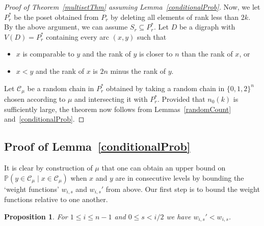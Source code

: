 \documentclass[11 pt]{article}
\newtheorem{prop}[equation]{Proposition}
\theoremstyle{definition}
\theoremstyle{case}
\numberwithin{equation}{section}
\begin{document}
\begin{proof}[Proof of Theorem~\ref{multisetThm} assuming Lemma~\ref{conditionalProb}]
Now, we let $P_r^*$ be the poset obtained from $P_r$ by deleting all elements of rank less than $2k$. By the above argument, we can assume $S_r\subseteq P_r^*$. Let $D$ be a digraph with $V(D)=P_r^*$ containing every arc $(x,y)$ such that
\begin{itemize}
\item $x$ is comparable to $y$ and the rank of $y$ is closer to $n$ than the rank of $x$, or
\item $x<y$ and the rank of $x$ is $2n$ minus the rank of $y$. 
\end{itemize}
Let $\mathcal{C}_\mu$ be a random chain in $P_r^*$ obtained by taking a random chain in $\{0,1,2\}^n$ chosen according to $\mu$ and intersecting it with $P_r^*$. Provided that $n_0(k)$ is sufficiently large, the theorem now follows from Lemmas~\ref{randomCount} and~\ref{conditionalProb}.
\end{proof}

\subsection{Proof of Lemma~\ref{conditionalProb}}

It is clear by construction of $\mu$ that one can obtain an upper bound on  $\mathbb{P}\left(y\in \mathcal{C}_\mu\mid x\in \mathcal{C}_\mu\right)$ when $x$ and $y$ are in consecutive levels by bounding the `weight functions' $w_{i,s}$ and $w_{i,s}'$ from above. Our first step is to bound the weight functions relative to one another.

\begin{prop}
\label{wboundPROP}
For $1\leq i\leq n-1$ and $0\leq s < i/2$ we have $w_{i,s}' <  w_{i,s}$. 
\end{prop}
\end{document}
